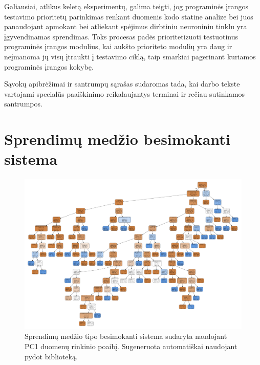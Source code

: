 \documentclass{VUMIFPSbakalaurinis}
\begin{document}
Galiausiai, atlikus keletą eksperimentų, galima teigti, jog programinės įrangos testavimo prioritetų parinkimas renkant duomenis kodo statine analize bei juos panaudojant apmokant bei atliekant spėjimus dirbtiniu neuroniniu tinklu yra įgyvendinamas sprendimas. Toks procesas padės prioritetizuoti testuotinus programinės įrangos modulius, kai aukšto prioriteto modulių yra daug ir neįmanoma jų visų įtraukti į testavimo ciklą, taip smarkiai pagerinant kuriamos programinės įrangos kokybę.

\printbibliography[heading=bibintoc]  %

Sąvokų apibrėžimai ir santrumpų sąrašas sudaromas tada, kai darbo tekste
vartojami specialūs paaiškinimo reikalaujantys terminai ir rečiau sutinkamos
santrumpos.

\appendix  %

\section{Sprendimų medžio besimokanti sistema}
\begin{figure}[H]
    \centering
    \includegraphics[scale=0.24, angle=90]{img/tree}
    \caption{Sprendimų medžio tipo besimokanti sistema sudaryta naudojant PC1 duomenų rinkinio poaibį. Sugeneruota automatiškai naudojant pydot biblioteką.}
    \label{img:tree}
\end{figure}
\end{document}

